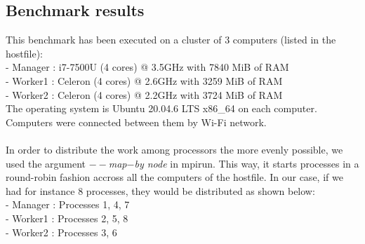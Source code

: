 \subsection{Benchmark results}
This benchmark has been executed on a cluster of 3 computers (listed in the hostfile):\\
 - Manager : i7-7500U (4 cores) @ 3.5GHz with 7840 MiB of RAM\\
 - Worker1 : Celeron (4 cores) @ 2.6GHz with 3259 MiB of RAM\\
 - Worker2 : Celeron (4 cores) @ 2.2GHz with 3724 MiB of RAM\\
The operating system is Ubuntu 20.04.6 LTS x86\_64 on each computer. Computers were connected between them by Wi-Fi network.\\
\\
In order to distribute the work among processors the more evenly possible, we used the argument \emph{$--$map$-$by node} in mpirun. This way, it starts processes in a round-robin fashion accross all the computers of the hostfile. In our case, if we had for instance 8 processes, they would be distributed as shown below:\\
- Manager : Processes 1, 4, 7\\
- Worker1 : Processes 2, 5, 8\\
- Worker2 : Processes 3, 6\\
